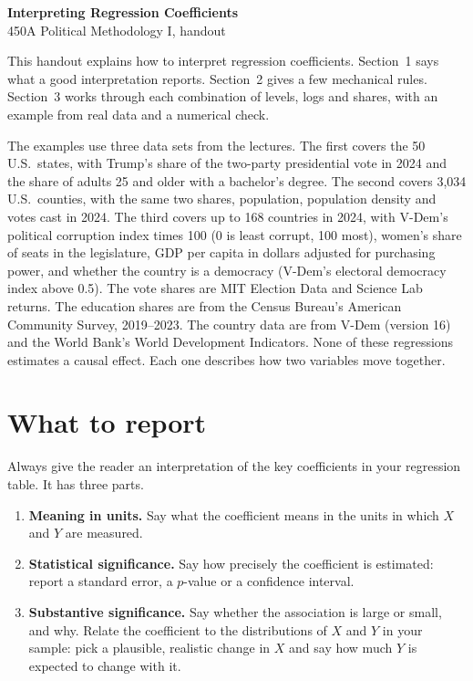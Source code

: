 \documentclass[11pt]{article}
\begin{document}
\begin{center}
{\Large\bfseries Interpreting Regression Coefficients}\\[4pt]
450A Political Methodology I, handout
\end{center}

This handout explains how to interpret regression coefficients. Section~1 says what a good
interpretation reports. Section~2 gives a few mechanical rules. Section~3 works through each
combination of levels, logs and shares, with an example from real data and a numerical check.

The examples use three data sets from the lectures. The first covers the 50 U.S.\ states, with Trump's
share of the two-party presidential vote in 2024 and the share of adults 25 and older with a
bachelor's degree. The second covers 3,034 U.S.\ counties, with the same two shares, population,
population density and votes cast in 2024. The third covers up to 168 countries in 2024, with V-Dem's
political corruption index times 100 (0 is least corrupt, 100 most), women's share of seats in the
legislature, GDP per capita in dollars adjusted for purchasing power, and whether the country is a
democracy (V-Dem's electoral democracy index above 0.5). The vote shares are MIT Election Data and
Science Lab returns. The education shares are from the Census Bureau's American Community Survey,
2019--2023. The country data are from V-Dem (version 16) and the World Bank's World Development
Indicators. None of these regressions estimates a causal effect. Each one describes how two
variables move together.

\section{What to report}

Always give the reader an interpretation of the key coefficients in your regression table. It has
three parts.
\begin{enumerate}
\item \textbf{Meaning in units.} Say what the coefficient means in the units in which $X$ and $Y$
  are measured.
\item \textbf{Statistical significance.} Say how precisely the coefficient is estimated: report a
  standard error, a $p$-value or a confidence interval.
\item \textbf{Substantive significance.} Say whether the association is large or small, and why.
  Relate the coefficient to the distributions of $X$ and $Y$ in your sample: pick a plausible,
  realistic change in $X$ and say how much $Y$ is expected to change with it.
\end{enumerate}
\end{document}
